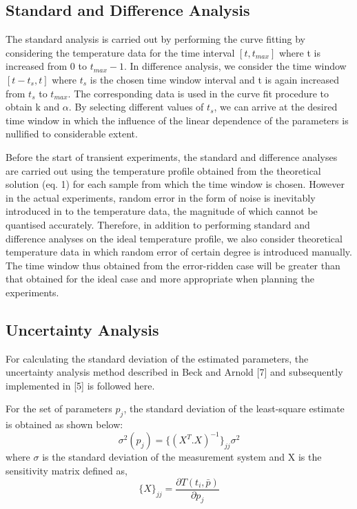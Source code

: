 \documentclass[12pt]{report}
\begin{document}
\subsection*{Standard and Difference Analysis}

The standard analysis is carried out by performing the curve fitting by considering the temperature data for 
the time interval $[t,t_{max}]$ where t is increased from 0 to $t_{max}-1$. In difference analysis, we consider the time window $[t - t_s,t]$ where $t_s$ is the chosen time window interval and t is again increased from $t_s$ to $t_{max}$.  The corresponding data is used in the curve fit procedure to obtain k and $\alpha$. By selecting different values of $t_s$, we can arrive at the desired time window in which the influence of the linear dependence of the parameters is nullified to considerable extent. 

Before the start of transient experiments, the standard and difference analyses are carried out using the temperature profile obtained from the theoretical solution (eq. 1) for each sample from which the time window is chosen. However in the actual experiments, random error in the form of noise is inevitably introduced in to the temperature data, the magnitude of which cannot be quantised accurately. Therefore, in addition to performing standard and difference analyses on the ideal temperature profile, we also consider theoretical temperature data in which random error of certain degree is introduced manually. The time window thus obtained from the error-ridden case will be greater than that obtained for the ideal case and more appropriate when planning the experiments. 

\subsection*{Uncertainty Analysis}


For calculating the standard deviation of the estimated parameters, the
uncertainty analysis method described in Beck and Arnold {[}7{]} and
subsequently implemented in {[}5{]} is followed here.

 For the set of parameters $p_j$, the standard deviation of the
least-square estimate is obtained as shown below:
\begin{equation}
\sigma^2(p_j) = \{(X^T.X)^{-1}\}_{jj}\sigma^2
\end{equation}
where \(\sigma\) is the standard deviation of the measurement system and
X is the sensitivity matrix defined as,
\begin{equation}
\{X\}_{jj} = \frac{\partial T(t_i, \bar{p})}{\partial p_j}
\end{equation}
\end{document}
